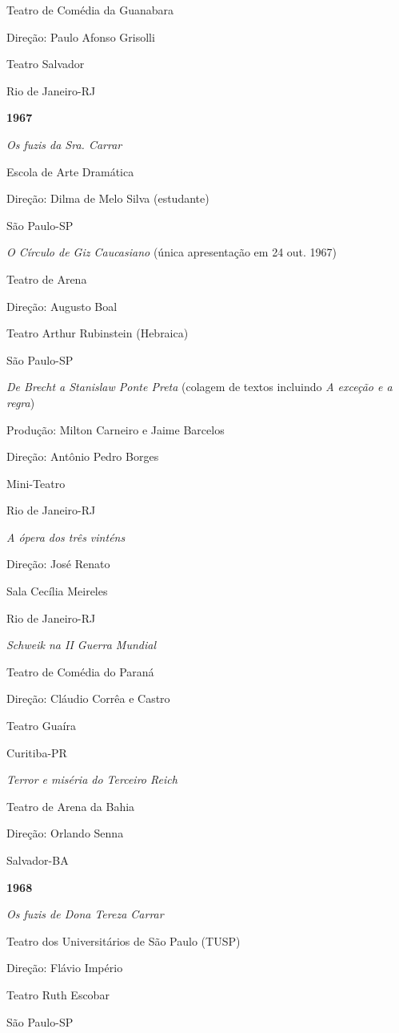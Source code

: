 Teatro de Comédia da Guanabara

Direção: Paulo Afonso Grisolli

Teatro Salvador

Rio de Janeiro-RJ

\textbf{1967}

\textit{Os fuzis da Sra. Carrar}

Escola de Arte Dramática

Direção: Dilma de Melo Silva (estudante)

São Paulo-SP

\textit{O Círculo de Giz Caucasiano} (única apresentação em 24 out. 1967)

Teatro de Arena

Direção: Augusto Boal

Teatro Arthur Rubinstein (Hebraica)

São Paulo-SP

\textit{De Brecht a Stanislaw Ponte Preta} (colagem de textos incluindo
\textit{A exceção e a regra})

Produção: Milton Carneiro e Jaime Barcelos

Direção: Antônio Pedro Borges

Mini-Teatro

Rio de Janeiro-RJ

\textit{A ópera dos três vinténs}

Direção: José Renato

Sala Cecília Meireles

Rio de Janeiro-RJ

\textit{Schweik na II Guerra Mundial}

Teatro de Comédia do Paraná

Direção: Cláudio Corrêa e Castro

Teatro Guaíra

Curitiba-PR

\textit{Terror e miséria do Terceiro Reich}

Teatro de Arena da Bahia

Direção: Orlando Senna

Salvador-BA

\textbf{1968}

\textit{Os fuzis de Dona Tereza Carrar}

Teatro dos Universitários de São Paulo (TUSP)

Direção: Flávio Império

Teatro Ruth Escobar

São Paulo-SP


